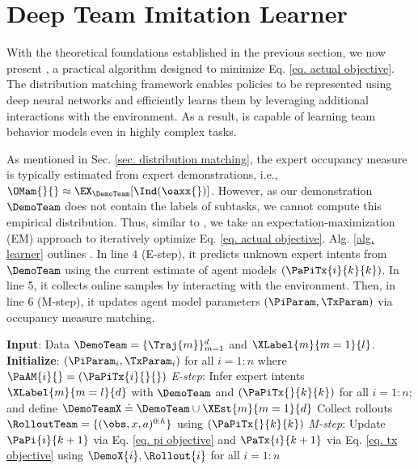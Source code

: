 \section{Deep Team Imitation Learner}
With the theoretical foundations established in the previous section, we now present \ouralg, a practical algorithm designed to minimize Eq. \ref{eq. actual objective}. The distribution matching framework enables policies to be represented using deep neural networks and efficiently learns them by leveraging additional interactions with the environment. As a result, \ouralg is capable of learning team behavior models even in highly complex tasks.

As mentioned in Sec. \ref{sec. distribution matching}, the expert occupancy measure is typically estimated from expert demonstrations, i.e., $\OMam{}{} \approx \EX_{\DemoTeam}[\Ind(\oaxx{})]$. However, as our demonstration $\DemoTeam$ does not contain the labels of subtasks, we cannot compute this empirical distribution. Thus, similar to \cite{jing2021adversarial}, we take an expectation-maximization (EM) approach to iteratively optimize Eq. \ref{eq. actual objective}. Alg. \ref{alg. learner} outlines \ouralg. In line 4 (E-step), it predicts unknown expert intents from $\DemoTeam$ using the current estimate of agent models $(\PaPiTx{i}{k}{k})$. In line 5, it collects online samples by interacting with the environment. Then, in line 6 (M-step), it updates agent model parameters $(\PiParam, \TxParam)$ via occupancy measure matching. 
 


\begin{algorithm}[t]
    \caption{\ouralg: \ouralgfull}
    \label{alg. learner}
    \begin{algorithmic}[1]
        \STATE \textbf{Input}: Data $\DemoTeam = \{\Traj{m}\}_{m=1}^d$ and $\XLabel{m}{m=1}{l}$.
        \STATE \textbf{Initialize}: $(\PiParam_i, \TxParam_i)$ for all $i=1:n$ where $\PaAM{i}{} = (\PaPiTx{i}{}{})$
        \REPEAT
            \STATE \textit{E-step}: Infer expert intents $\XLabel{m}{m=l}{d}$ with $\DemoTeam$ and $(\PaPiTx{}{k}{k})$ for all $i=1:n$; and define $\DemoTeamX\doteq \DemoTeam \cup \XEst{m}{m=1}{d}$
            \STATE Collect rollouts $\RolloutTeam = \{(\obs, x, a)^{0:h}\}$ using $(\PaPiTx{}{k}{k})$
            \STATE \textit{M-step}: Update $\PaPi{i}{k+1}$ via Eq. \ref{eq. pi objective} and  $\PaTx{i}{k+1}$ via Eq. \ref{eq. tx objective} using $\DemoX{i}, \Rollout{i}$ for all $i=1:n$
    \end{algorithmic}
\end{algorithm}

